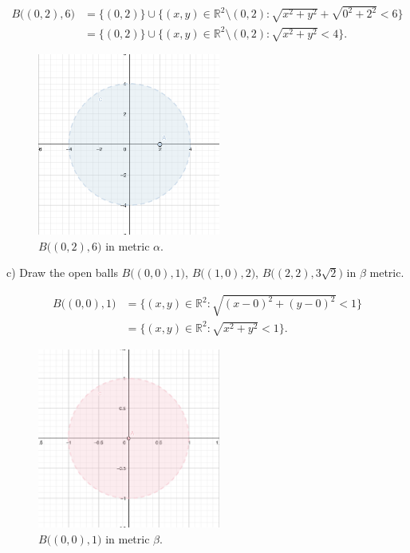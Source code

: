 \documentclass[a4paper,11pt]{article}
\begin{document}

 \begin{align*} 
    B \big((0, 2), 6 \big) &= \{(0,2)\} \cup \{(x,y) \in \mathbb{R}^2 \setminus (0,2) : \sqrt{x^2 + y^2} + \sqrt{0^2 + 2^2} < 6 \} 
    \\
    &= \{(0,2)\} \cup \{(x,y) \in \mathbb{R}^2 \setminus (0,2) : \sqrt{x^2 + y^2} < 4 \}. 
\end{align*}

\begin{figure}[ht!]
    \centering
    \includegraphics[width=60mm]{b3.png}
    \caption{$B \big((0, 2), 6 \big)$ in metric $\alpha$.}
\end{figure}
\noindent
c) Draw the open balls $B \big((0, 0), 1 \big)$, $B \big((1, 0), 2 \big)$, $B \big((2, 2), 3 \sqrt{2} \big)$ in $\beta$ metric. 

\begin{align*} 
    B \big((0, 0), 1 \big) &= \{(x,y) \in \mathbb{R}^2 : \sqrt{(x - 0)^2 + (y - 0)^2} < 1 \}
    \\
    &= \{(x,y) \in \mathbb{R}^2 : \sqrt{x^2 + y^2} < 1 \}.
\end{align*}

\begin{figure}[ht!]
    \centering
    \includegraphics[width=60mm]{b1.png}
    \caption{$B \big((0, 0), 1 \big)$ in metric $\beta$.}
\end{figure}
\end{document}
